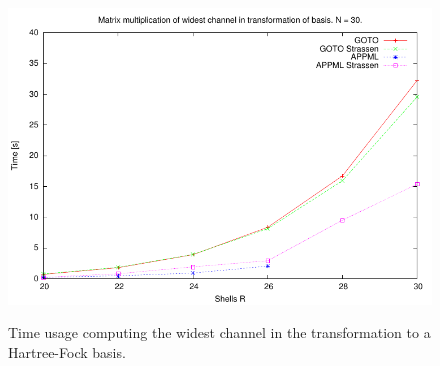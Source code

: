 \begin{figure}
\begin{center}
{\includegraphics[scale=0.6]{../10-results/figs/timeMult/timeMultHFsys_5.pdf}
}
\caption{Time usage computing the widest channel in the transformation to a Hartree-Fock basis.}
\label{fig:results:timeMultHFsys}
\end{center}
\end{figure}

